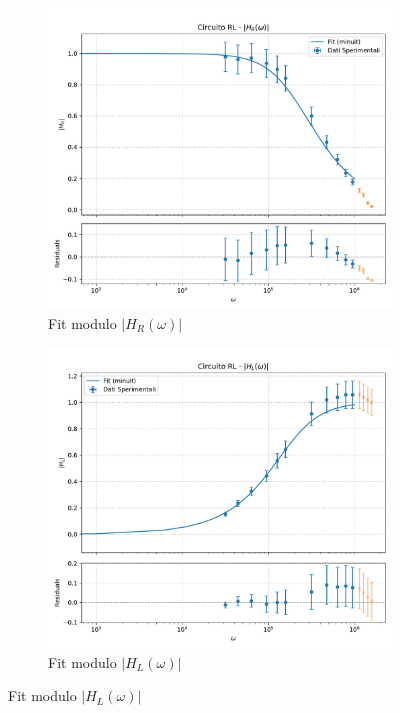 \documentclass[a4paper]{article}
\begin{document}
\begin{figure}[htbp]
    \centering
    \begin{subfigure}[b]{0.495\textwidth}
        \centering
        \includegraphics[width=\linewidth]{grafici/rl_hr.pdf}
        \caption{Fit modulo $|H_R(\omega)|$}
        \label{fig:rl_hr}
    \end{subfigure}
    \hfill
    \begin{subfigure}[b]{0.495\textwidth}
        \centering
        \includegraphics[width=\linewidth]{grafici/rl_hl.pdf}
        \caption{Fit modulo $|H_L(\omega)|$}
        \label{fig:rl_hl}
    \end{subfigure}


\end{figure}
\end{document}
